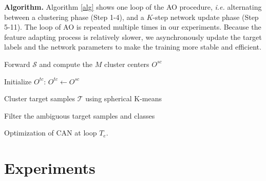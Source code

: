 \documentclass[10pt,twocolumn,letterpaper]{article}
\begin{document}
\textbf{Algorithm.}
Algorithm \ref{alg} shows one loop of the AO procedure, 
\emph{i.e.} alternating between a clustering phase (Step 1-4), and a ${K}$-step network update phase (Step 5-11).  
The loop of AO is repeated multiple times in our experiments. 
Because the feature adapting process is relatively slower,
we asynchronously update the target labels and the network parameters
to make the training more stable and efficient.

\begin{algorithm}[h]




 




  Forward $\mathcal{S}$ and compute the $M$ cluster centers $O^{sc}$ \; 
  
  Initialize $O^{tc}$: $O^{tc} \gets O^{sc}$ \;
  
  Cluster target samples $\mathcal{T}$ using spherical K-means\;
  
  Filter the ambiguous target samples and classes\;
  




 \caption{Optimization of CAN at loop $T_e$.}
 \label{alg}
\end{algorithm}










 
\section{Experiments}\label{sec:experiments}
\end{document}
